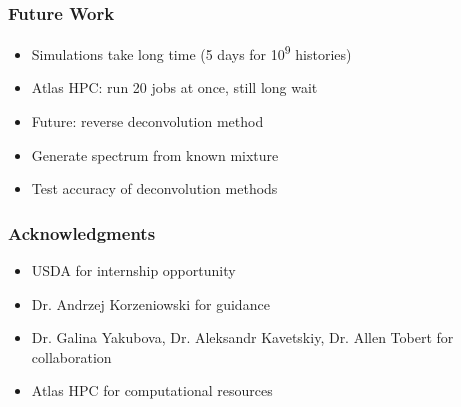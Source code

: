 \documentclass[xcolor=dvipsnames,envcountsect]{beamer}
\begin{document}
\begin{frame}
  \frametitle{Future Work}
  \begin{itemize}
    \item Simulations take long time (5 days for 10\textsuperscript{9} histories)
    \item Atlas HPC: run 20 jobs at once, still long wait
    \item Future: reverse deconvolution method
    \item Generate spectrum from known mixture
    \item Test accuracy of deconvolution methods
  \end{itemize}
\end{frame}

\begin{frame}
  \frametitle{Acknowledgments}
  \begin{itemize}
    \item USDA for internship opportunity
    \item Dr. Andrzej Korzeniowski for guidance
    \item Dr. Galina Yakubova, Dr. Aleksandr Kavetskiy, Dr. Allen Tobert for collaboration
    \item Atlas HPC for computational resources
  \end{itemize}
\end{frame}



\end{document}
